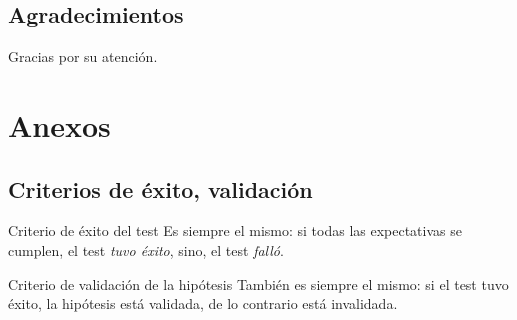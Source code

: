 %
\subsection{Agradecimientos}

  \begin{frame}
    \vspace{0mm}
    \begin{center}
      Gracias por su atención.
    \end{center}
  \end{frame}


\section{Anexos}

%
\subsection{Criterios de éxito, validación}

\begin{frame}[label=criterios]
  \begin{block}{Criterio de éxito del test}
    Es siempre el mismo: si \alert{todas} las expectativas se cumplen, el test \emph{tuvo éxito}, sino, el test \emph{falló}.
  \end{block}
  \begin{block}{Criterio de validación de la hipótesis}
    También es siempre el mismo: si el test tuvo éxito, la hipótesis está validada, de lo contrario está invalidada.
  \end{block}
  \hfill \hyperlink{expectativa}{}
\end{frame}
